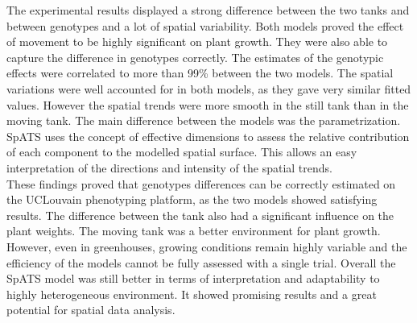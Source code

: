 \vspace{1cm}

The experimental results displayed a strong difference between the two tanks and between genotypes and a lot of spatial variability. Both models proved the effect of movement to be highly significant on plant growth. They were also able to capture the difference in genotypes correctly. The estimates of the genotypic effects were correlated to more than 99\% between the two models. The spatial variations were well accounted for in both models, as they gave very similar fitted values. However the spatial trends were more smooth in the still tank than in the moving tank. The main difference between the models was the parametrization. SpATS uses the concept of effective dimensions to assess the relative contribution of each component to the modelled spatial surface. This allows an easy interpretation of the directions and intensity of the spatial trends.\\


These findings proved that genotypes differences can be correctly estimated on the UCLouvain phenotyping platform, as the two models showed satisfying results. The difference between the tank also had a significant influence on the plant weights. The moving tank was a better environment for plant growth. However, even in greenhouses, growing conditions remain highly variable and the efficiency of the models cannot be fully assessed with a single trial. Overall the SpATS model was still better in terms of interpretation and adaptability to highly heterogeneous environment. It showed promising results and a great potential for spatial data analysis.

